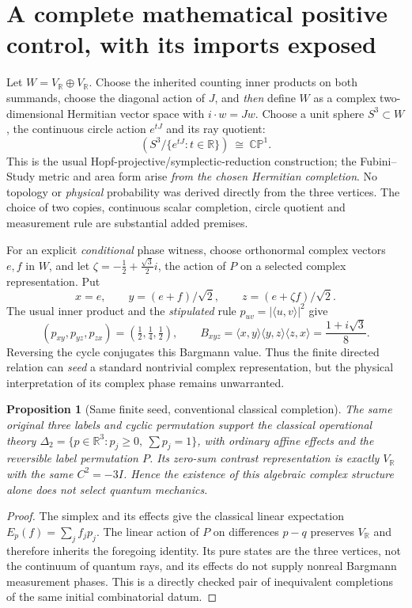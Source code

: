 \documentclass[10pt,letterpaper]{article}
\newtheorem{proposition}[theorem]{Proposition}
\newcommand{\R}{\mathbb R}
\newcommand{\CP}{\mathbb{CP}}
\begin{document}
\section{A complete mathematical positive control, with its imports exposed}
Let $W=V_\R\oplus V_\R$.  Choose the inherited counting inner products on both summands, choose the diagonal action of $J$, and \emph{then} define $W$ as a complex two-dimensional Hermitian vector space with $i\cdot w=Jw$.  Choose a unit sphere $S^3\subset W$, the continuous circle action $e^{tJ}$ and its ray quotient:
\begin{equation}
\left(S^3/\{e^{tJ}:t\in\R\}\right)\ \cong\ \CP^1.\label{eq:hopf}
\end{equation}
This is the usual Hopf-projective/symplectic-reduction construction; the Fubini--Study metric and area form arise \emph{from the chosen Hermitian completion}.  No topology or \emph{physical} probability was derived directly from the three vertices.  The choice of two copies, continuous scalar completion, circle quotient and measurement rule are substantial added premises.

For an explicit \emph{conditional} phase witness, choose orthonormal complex vectors $e,f$ in $W$, and let $\zeta=-\tfrac12+\tfrac{\sqrt3}{2}i$, the action of $P$ on a selected complex representation.  Put
\[
x=e,\qquad y=(e+f)/\sqrt2,\qquad z=(e+\zeta f)/\sqrt2.
\]
The usual inner product and the \emph{stipulated} rule $p_{uv}=|\langle u,v\rangle|^2$ give
\begin{equation}
(p_{xy},p_{yz},p_{zx})=(\tfrac12,\tfrac14,\tfrac12),\qquad
B_{xyz}=\langle x,y\rangle\langle y,z\rangle\langle z,x\rangle
=\frac{1+i\sqrt3}{8}.\label{eq:witness}
\end{equation}
Reversing the cycle conjugates this Bargmann value.  Thus the finite directed relation can \emph{seed} a standard nontrivial complex representation, but the physical interpretation of its complex phase remains unwarranted.

\begin{proposition}[Same finite seed, conventional classical completion]
The same original three labels and cyclic permutation support the classical operational theory $\Delta_2=\{p\in\R^3:p_j\ge0,\ \sum p_j=1\}$, with ordinary affine effects and the reversible label permutation $P$.  Its zero-sum contrast representation is exactly $V_\R$ with the same $C^2=-3I$.  Hence the existence of this algebraic complex structure alone does not select quantum mechanics.
\end{proposition}
\begin{proof}
The simplex and its effects give the classical linear expectation $E_p(f)=\sum_j f_jp_j$.  The linear action of $P$ on differences $p-q$ preserves $V_\R$ and therefore inherits the foregoing identity.  Its pure states are the three vertices, not the continuum of quantum rays, and its effects do not supply nonreal Bargmann measurement phases.  This is a directly checked pair of inequivalent completions of the same initial combinatorial datum.
\end{proof}
\end{document}
